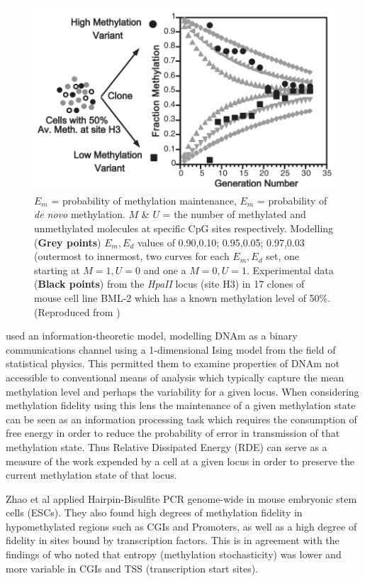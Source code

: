 \documentclass[
]{book}
\begin{document}
\begin{figure}

{\centering \includegraphics[width=0.7\linewidth]{figs/Riggs2004PNASfig2DNAmFidelity} 

}

\caption{\(E_m\) = probability of methylation maintenance, \(E_m\) = probability of \emph{de novo} methylation. \(M\) \& \(U\) = the number of methylated and unmethylated molecules at specific CpG sites respectively. Modelling (\textbf{Grey points}) \(E_m,E_d\) values of 0.90,0.10; 0.95,0.05; 0.97,0.03 (outermost to innermost, two curves for each \(E_m,E_d\) set, one starting at \(M=1,U=0\) and one a \(M=0,U=1\). Experimental data (\textbf{Black points}) from the \emph{HpaII} locus (site H3) in 17 clones of mouse cell line BML-2 which has a known methylation level of 50\%. (Reproduced from \citep{Riggs2004a})}\label{fig:Riggs2004PNASfig2DNAmFidelity}
\end{figure}



\citet{Jenkinson2017} used an information-theoretic model, modelling DNAm as a binary communications channel using a 1-dimensional Ising model from the field of statistical physics. This permitted them to examine properties of DNAm not accessible to conventional means of analysis which typically capture the mean methylation level and perhaps the variability for a given locus. When considering methylation fidelity using this lens the maintenance of a given methylation state can be seen as an information processing task which requires the consumption of free energy in order to reduce the probability of error in transmission of that methylation state. Thus Relative Dissipated Energy (RDE) can serve as a measure of the work expended by a cell at a given locus in order to preserve the current methylation state of that locus.

Zhao et al \citep{Zhao2014} applied Hairpin-Bisulfite PCR genome-wide in mouse embryonic stem cells (ESCs). They also found high degrees of methylation fidelity in hypomethylated regions such as CGIs and Promoters, as well as a high degree of fidelity in sites bound by transcription factors. This is in agreement with the findings of \citet{Jenkinson2017} who noted that entropy (methylation stochasticity) was lower and more variable in CGIs and TSS (transcription start sites).
\end{document}
